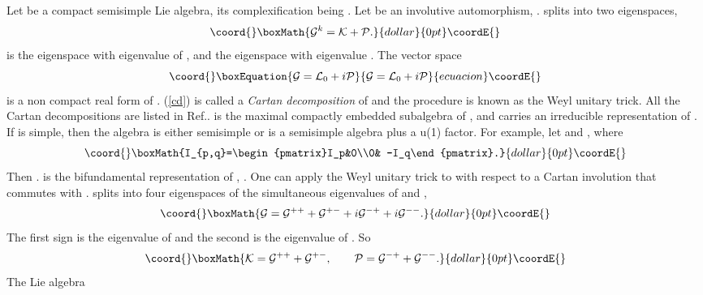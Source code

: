 \documentclass[a4paper,12pt]{article}
\begin{document}
Let \coordHE{} be a compact semisimple Lie algebra, its
complexification being \coordHE{}. Let \coordHE{} be an
involutive automorphism, \coordHE{}. \coordHE{} splits into two
eigenspaces, $$\coord{}\boxMath{\g^k=\ka+\p.}{dollar}{0pt}\coordE{}$$  \myHighlight{$\ka$}\coordHE{} is the eigenspace with
eigenvalue \coordHE{} of \myHighlight{$\theta$}\coordHE{}, and \myHighlight{$\p$}\coordHE{} the eigenspace with
eigenvalue \coordHE{}. The vector space
\begin{equation}\coord{}\boxEquation{\g=\La_0+i\p\label{cd}}{\g=\La_0+i\p}{ecuacion}\coordE{}\end{equation} is a non
compact real form of \coordHE{}. (\ref{cd}) is called a {\it Cartan
decomposition} of \myHighlight{$\g$}\coordHE{} and the procedure is known as the Weyl
unitary trick. All the Cartan decompositions are listed in
Ref.\cite{he}. \coordHE{} is the maximal compactly embedded
subalgebra of \myHighlight{$\g$}\coordHE{}, and \myHighlight{$\p$}\coordHE{} carries an irreducible representation
of \coordHE{}.
If \myHighlight{$\g$}\coordHE{} is simple, then the algebra \myHighlight{$\ka$}\coordHE{} is either semisimple or
is a semisimple algebra plus  a u(1) factor. For example, let
\coordHE{} and \coordHE{}, where
$$\coord{}\boxMath{I_{p,q}=\begin{pmatrix}I_p&0\\0& -I_q\end{pmatrix}.}{dollar}{0pt}\coordE{}$$ Then
\coordHE{}. \myHighlight{$\p$}\coordHE{} is the bifundamental
representation of \coordHE{},
\coordHE{} .
One can apply  the Weyl unitary trick  to \myHighlight{$\g$}\coordHE{} with respect to a
Cartan involution \coordHE{} that commutes with \myHighlight{$\theta$}\coordHE{}. \myHighlight{$\g$}\coordHE{}
splits into four eigenspaces of the simultaneous eigenvalues of
\myHighlight{$\theta$}\coordHE{} and \coordHE{}, $$\coord{}\boxMath{\g=\g^{++}+\g^{+-}+i\g^{-+}+i\g^{--}.}{dollar}{0pt}\coordE{}$$
The first sign is the eigenvalue of \myHighlight{$\theta$}\coordHE{} and the second is the
eigenvalue of \coordHE{}. So $$\coord{}\boxMath{\ka=\g^{++}+\g^{+-}, \qquad
\p=\g^{-+}+\g^{--}.}{dollar}{0pt}\coordE{}$$ The Lie algebra
\end{document}
